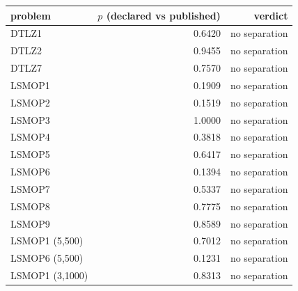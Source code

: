 \footnotesize
\setlength{\tabcolsep}{5pt}
\begin{tabular}{lrr}
\toprule
problem & $p$ (declared vs published) & verdict \\\midrule
DTLZ1 & 0.6420 & no separation \\
DTLZ2 & 0.9455 & no separation \\
DTLZ7 & 0.7570 & no separation \\
LSMOP1 & 0.1909 & no separation \\
LSMOP2 & 0.1519 & no separation \\
LSMOP3 & 1.0000 & no separation \\
LSMOP4 & 0.3818 & no separation \\
LSMOP5 & 0.6417 & no separation \\
LSMOP6 & 0.1394 & no separation \\
LSMOP7 & 0.5337 & no separation \\
LSMOP8 & 0.7775 & no separation \\
LSMOP9 & 0.8589 & no separation \\
LSMOP1 (5,500) & 0.7012 & no separation \\
LSMOP6 (5,500) & 0.1231 & no separation \\
LSMOP1 (3,1000) & 0.8313 & no separation \\
\bottomrule
\end{tabular}
